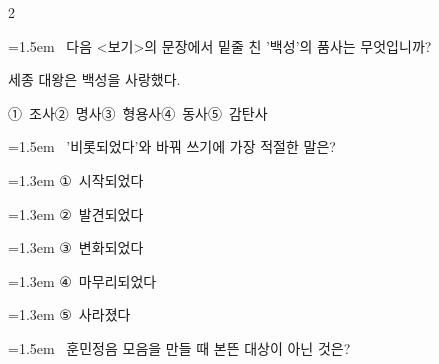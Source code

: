 \documentclass[11pt, a4paper]{article}
\begin{document}
\begin{multicols}{2}
\noindent\begin{minipage}{\columnwidth}
\vspace{2mm}
{\hangindent=1.5em  ~다음 <보기>의 문장에서 밑줄 친 '백성'의 품사는 무엇입니까?\par}

\vspace{1mm}
\begin{boxibox}
세종 대왕은 백성을 사랑했다. \\
\end{boxibox}
\vspace{1mm}

\vspace{0.5mm}
\noindent
\mbox{①~조사}\hspace{1em}\mbox{②~명사}\hspace{1em}\mbox{③~형용사}\hspace{1em}\mbox{④~동사}\hspace{1em}\mbox{⑤~감탄사}

\vspace{4mm}
\end{minipage}
\par

\noindent\begin{minipage}{\columnwidth}
\vspace{2mm}
{\hangindent=1.5em  ~'비롯되었다'와 바꿔 쓰기에 가장 적절한 말은?\par}

\vspace{0.5mm}
{\hangindent=1.3em  \noindent\hspace{0.3em}①~시작되었다\par}
{\hangindent=1.3em  \noindent\hspace{0.3em}②~발견되었다\par}
{\hangindent=1.3em  \noindent\hspace{0.3em}③~변화되었다\par}
{\hangindent=1.3em  \noindent\hspace{0.3em}④~마무리되었다\par}
{\hangindent=1.3em  \noindent\hspace{0.3em}⑤~사라졌다\par}
\vspace{4mm}
\end{minipage}
\par

\noindent\begin{minipage}{\columnwidth}
\vspace{2mm}
{\hangindent=1.5em  ~훈민정음 모음을 만들 때 본뜬 대상이 아닌 것은?\par}


\end{minipage}
\end{multicols}
\end{document}
